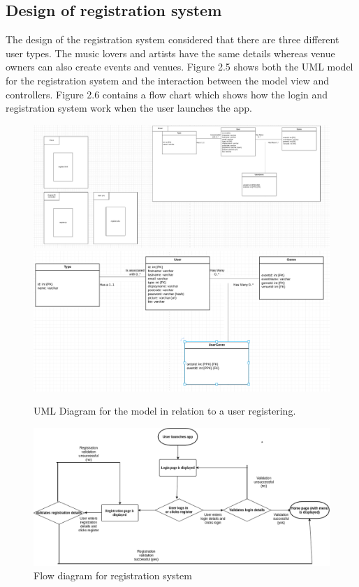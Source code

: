 \subsection{Design of registration system}
The design of the registration system considered that there are three different user types. The music lovers and artists have the same details whereas venue owners can also create events and venues. Figure 2.5 shows both the UML model for the registration system and the interaction between the model view and controllers. Figure 2.6  contains a flow chart which shows how the login and registration system work when the user launches the app.
\begin{center}
\begin{figure}[H]
\includegraphics[width=\textwidth,height=\textheight,keepaspectratio]{images/register}
\includegraphics[width=\textwidth,height=\textheight,keepaspectratio]{images/users}
\caption{UML Diagram for the model in relation to a user registering.}
\end{figure}
\end{center}
\begin{center}
\begin{figure}[H]
\includegraphics[width=\textwidth,height=\textheight,keepaspectratio]{images/flow}
\caption{Flow diagram for registration system}
\end{figure}
\end{center}



